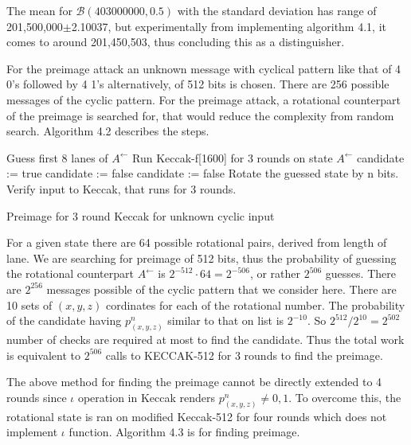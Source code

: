 The mean for $\mathcal{B}(403000000, 0.5)$ with the standard deviation has range of 201,500,000$\pm$2.10037, but 
experimentally from implementing algorithm 4.1, it comes to around 201,450,503, thus concluding this as a distinguisher.

For the preimage attack an unknown message with cyclical pattern like that of 4 0's followed by 4 1's alternatively, of
512 bits is chosen. There are 256 possible messages of the cyclic pattern. For the preimage attack, a rotational
counterpart of the preimage is searched for, that would reduce the complexity from random search. Algorithm 4.2 describes
the steps.

\begin{algorithm}[H]
\begin{algorithmic}[1]
  \State Guess first 8 lanes of $A^{\leftarrow}$
  \State Run Keccak-f[1600] for 3 rounds on state $A^{\leftarrow}$
    \State candidate := true
        \State candidate := false
      \EndIf
        \State candidate := false
      \EndIf
    \EndFor
      \State Rotate the guessed state by n bits.
      \State Verify input to Keccak, that runs for 3 rounds.
    \EndIf
  \EndFor
\end{algorithmic}
\caption[Preimage for 3 round Keccak for unknown cyclic input \cite{00022}]
{Preimage for 3 round Keccak for unknown cyclic input \cite{00022}}
\label{alg:seq}
\end{algorithm}

For a given state there are 64 possible rotational pairs, derived from length of lane. We are searching for preimage
of 512 bits, thus the probability of guessing the rotational counterpart $A^{\leftarrow}$ is $2^{-512} \cdot 64 = 2^{-506}$,
or rather $2^{506}$ guesses. There are $2^{256}$ messages possible of the cyclic pattern that we consider here. There
are 10 sets of $(x, y, z)$ cordinates for each of the rotational number. The probability of the candidate having 
$p^n_{(x, y, z)}$ similar to that on list is $2^{-10}$. So $2^{512} / 2^{10} = 2^{502}$ number of checks are required
at most to find the candidate. Thus the total work is equivalent to $2^{506}$ calls to KECCAK-512 for 3 rounds to find
the preimage.

The above method for finding the preimage cannot be directly extended to 4 rounds since $\iota$ operation in Keccak
renders $p^n_{(x, y, z)} \neq 0, 1$. To overcome this, the rotational state is ran on modified Keccak-512 for four rounds
which does not implement $\iota$ function. Algorithm 4.3 is for finding preimage.

